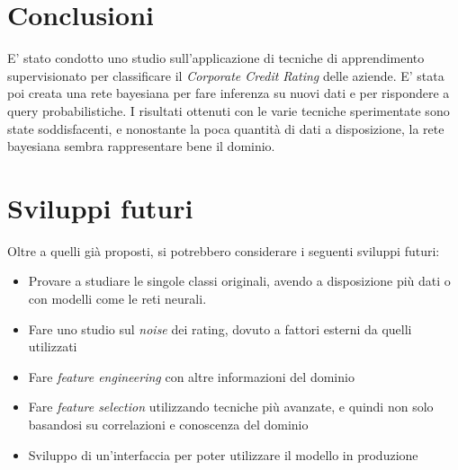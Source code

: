 \section{Conclusioni}
\noindent

\noindent E' stato condotto uno studio sull'applicazione di tecniche di apprendimento supervisionato per classificare il \textit{Corporate Credit Rating} delle aziende. E' stata poi creata una rete bayesiana per fare inferenza su nuovi dati e per rispondere a query probabilistiche. I risultati ottenuti con le varie tecniche sperimentate sono state soddisfacenti, e nonostante la poca quantità di dati a disposizione, la rete bayesiana sembra rappresentare bene il dominio.

\section{Sviluppi futuri}
\noindent Oltre a quelli già proposti, si potrebbero considerare i seguenti sviluppi futuri:
\begin{itemize}[label=-]
    \item Provare a studiare le singole classi originali, avendo a disposizione più dati o con modelli come le reti neurali.
    \item Fare uno studio sul \textit{noise} dei rating, dovuto a fattori esterni da quelli utilizzati
    \item Fare \textit{feature engineering} con altre informazioni del dominio
    \item Fare \textit{feature selection} utilizzando tecniche più avanzate, e quindi non solo basandosi su correlazioni e conoscenza del dominio
    \item Sviluppo di un'interfaccia per poter utilizzare il modello in produzione 
\end{itemize}